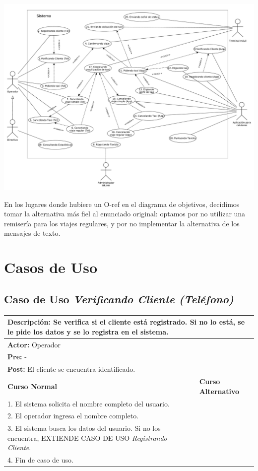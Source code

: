 \documentclass[a4paper]{article}
\begin{document}
\begin{center}
\includegraphics[width=1.1\textwidth,keepaspectratio,angle=90]{diag_CasosDeUso.pdf}
\end{center}
 
\newpage

En los lugares donde hubiere un O-ref en el diagrama de objetivos, decidimos tomar la alternativa m\'as fiel al enunciado original: optamos por no utilizar una remiser\'ia para los viajes regulares, y por no implementar la alternativa de los mensajes de texto.

\section{Casos de Uso}

\subsection{Caso de Uso \textit{Verificando Cliente (Tel\'efono)}}
\begin{center}
\begin{tabular}{|p{10cm} | p{6cm}|}
\hline
\multicolumn{2}{|p{16cm}|}{\textbf{Descripci\'on:} Se verifica si el cliente est\'a registrado. Si no lo est\'a, se le pide los datos y se lo registra en el sistema.} \\
\hline
\multicolumn{2}{|l|}{\textbf{Actor:} Operador} \\
\hline
\multicolumn{2}{|l|}{\textbf{Pre:} -} \\
\hline
\multicolumn{2}{|p{14cm}|}{\textbf{Post:} El cliente se encuentra identificado.}\\
\hline
\textbf{Curso Normal}  & \textbf{Curso Alternativo} \\ \hline
1. El sistema solicita el nombre completo del usuario. & \\ \hline
2. El operador ingresa el nombre completo. & \\ \hline
3. El sistema busca los datos del usuario. Si no los encuentra, EXTIENDE CASO DE USO \textit{Registrando Cliente}. & \\ \hline
4. Fin de caso de uso. & \\ \hline
\end{tabular}
\end{center}
\end{document}
